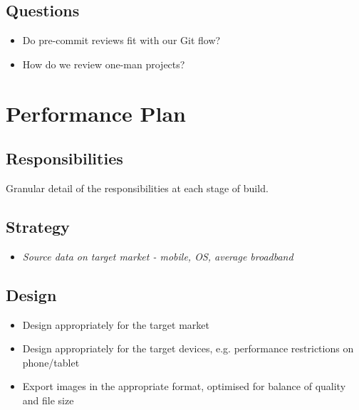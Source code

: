 \documentclass[letterpaper,10pt,english]{sphinxmanual}
\begin{document}
\section{Questions}
\label{peer_reviews:questions}\begin{itemize}
\item {} 
Do pre-commit reviews fit with our Git flow?

\item {} 
How do we review one-man projects?

\end{itemize}


\chapter{Performance Plan}
\label{performance_plan:performance-plan}\label{performance_plan::doc}

\section{Responsibilities}
\label{performance_plan:responsibilities}
Granular detail of the responsibilities at each stage of build.


\section{Strategy}
\label{performance_plan:strategy}\begin{itemize}
\item {} 
\emph{Source data on target market - mobile, OS, average broadband}

\end{itemize}


\section{Design}
\label{performance_plan:design}\begin{itemize}
\item {} 
Design appropriately for the target market

\item {} 
Design appropriately for the target devices, e.g. performance restrictions on phone/tablet

\item {} 
Export images in the appropriate format, optimised for balance of quality and file size

\end{itemize}
\end{document}

